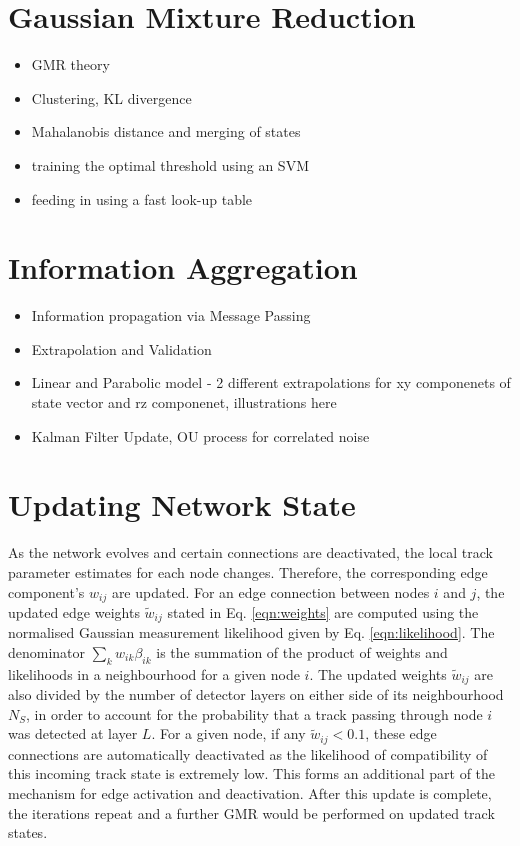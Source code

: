 \section{Gaussian Mixture Reduction}
\begin{itemize}
    \item GMR theory
    \item Clustering, KL divergence
    \item Mahalanobis distance and merging of states
    \item training the optimal threshold using an SVM
    \item feeding in using a fast look-up table
\end{itemize}



\section{Information Aggregation}
\begin{itemize}
    \item Information propagation via Message Passing
    \item Extrapolation and Validation
    \item Linear and Parabolic model - 2 different extrapolations for xy componenets of state vector and rz componenet, illustrations here
    \item Kalman Filter Update, OU process for correlated noise
\end{itemize}



\section{Updating Network State}
\label{gnn-updating-network-state}

As the network evolves and certain connections are deactivated, the local track parameter estimates for each node changes. Therefore, the corresponding edge component's $w_{ij}$ are updated. For an edge connection between nodes $i$ and $j$, the updated edge weights $\widetilde{w}_{ij}$ stated in Eq. \eqref{eqn:weights} are computed using the normalised Gaussian measurement likelihood given by Eq. \eqref{eqn:likelihood}. The denominator $\sum_{k}w_{ik}\beta_{ik}$ is the summation of the product of weights and likelihoods in a neighbourhood for a given node $i$. The updated weights $\widetilde{w}_{ij}$ are also divided by the number of detector layers on either side of its neighbourhood $N_S$, in order to account for the probability that a track passing through node $i$ was detected at layer $L$. For a given node, if any $\widetilde{w}_{ij} < 0.1$, these edge connections are automatically deactivated as the likelihood of compatibility of this incoming track state is extremely low. This forms an additional part of the mechanism for edge activation and deactivation. After this update is complete, the iterations repeat and a further GMR would be performed on updated track states. 

